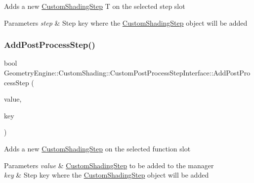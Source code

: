 Adds a new \mbox{\hyperlink{class_geometry_engine_1_1_custom_shading_1_1_custom_shading_step}{Custom\+Shading\+Step}} T on the selected step slot 
\begin{DoxyParams}{Parameters}
{\em step} & Step key where the \mbox{\hyperlink{class_geometry_engine_1_1_custom_shading_1_1_custom_shading_step}{Custom\+Shading\+Step}} object will be added \\
\hline
\end{DoxyParams}
\mbox{\label{class_geometry_engine_1_1_custom_shading_1_1_custom_post_process_step_interface_a2a4a9f74d40d548d4f10057e642bd607}} 
\subsubsection{\texorpdfstring{AddPostProcessStep()}{AddPostProcessStep()}}
{\footnotesize\ttfamily bool Geometry\+Engine\+::\+Custom\+Shading\+::\+Custom\+Post\+Process\+Step\+Interface\+::\+Add\+Post\+Process\+Step (\begin{DoxyParamCaption}\item[{\mbox{\hyperlink{class_geometry_engine_1_1_custom_shading_1_1_custom_post_process_step}{Custom\+Post\+Process\+Step}} $\ast$}]{value,  }\item[{const \mbox{\hyperlink{namespace_geometry_engine_1_1_custom_shading_a09e44ca81de5fe08c6d50271d680c4b1}{Custom\+Post\+Process\+Steps}} \&}]{key }\end{DoxyParamCaption})}

Adds a new \mbox{\hyperlink{class_geometry_engine_1_1_custom_shading_1_1_custom_shading_step}{Custom\+Shading\+Step}} on the selected function slot 
\begin{DoxyParams}{Parameters}
{\em value} & \mbox{\hyperlink{class_geometry_engine_1_1_custom_shading_1_1_custom_shading_step}{Custom\+Shading\+Step}} to be added to the manager \\
\hline
{\em key} & Step key where the \mbox{\hyperlink{class_geometry_engine_1_1_custom_shading_1_1_custom_shading_step}{Custom\+Shading\+Step}} object will be added \\
\hline
\end{DoxyParams}
\mbox{\label{class_geometry_engine_1_1_custom_shading_1_1_custom_post_process_step_interface_a6cf76b4b01230046a84cedcac73c089e}} 
